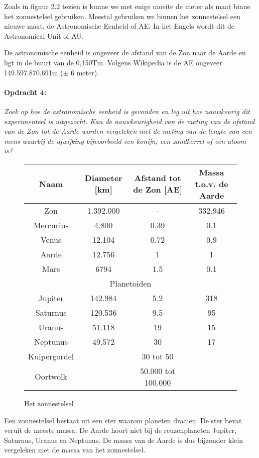Zoals in figuur 2.2 tezien is kunne we met enige moeite de meter als
maat binne het zonnestelsel gebruiken. Meestal gebruiken we binnen
het zonnestelsel een nieuwe maat, de Astronomische Eenheid of AE.
In het Engels wordt dit de Astronomical Unit of AU.

De astronomische eenheid is ongeveer de afstand van de Zon naar de
Aarde en ligt in de buurt van de 0,150Tm. Volgens Wikipedia is de
AE ongeveer 149.597.870.691m ($\pm$ 6 meter).


\paragraph*{Opdracht 4:}

\emph{Zoek op hoe de astronomische eenheid is gevonden en leg uit
hoe nauwkeurig dit experimenteel is uitgezocht. Kan de nauwkeurigheid
van de meting van de afstand van de Zon tot de Aarde worden vergeleken
met de meting van de lengte van een mens waarbij de afwijking bijvoorbeeld
een konijn, een zandkorrel of een atoom is?}

\begin{figure}[h]
\noindent \begin{centering}
\begin{tabular}{|c|c|c|c|}
\hline 
Naam & Diameter {[}km{]} & Afstand tot de Zon {[}AE{]} & Massa t.o.v. de Aarde\tabularnewline
\hline 
\hline 
Zon & 1.392.000 & - & 332.946\tabularnewline
\hline 
Mercurius & 4.800 & 0.39 & 0.1\tabularnewline
\hline 
Venus & 12.104 & 0.72 & 0.9\tabularnewline
\hline 
Aarde & 12.756 & 1 & 1\tabularnewline
\hline 
Mars & 6794 & 1.5 & 0.1\tabularnewline
\hline 
\multicolumn{4}{|c|}{Planetoiden}\tabularnewline
\hline 
Jupiter & 142.984 & 5.2 & 318\tabularnewline
\hline 
Saturnus & 120.536 & 9.5 & 95\tabularnewline
\hline 
Uranus & 51.118 & 19 & 15\tabularnewline
\hline 
Neptunus & 49.572 & 30 & 17\tabularnewline
\hline 
Kuipergordel &  & 30 tot 50 & \tabularnewline
\hline 
Oortwolk &  & 50.000 tot 100.000 & \tabularnewline
\hline 
\end{tabular}
\par\end{centering}

\caption{Het zonnestelsel}
\end{figure}


Een zonnestelsel bestaat uit een ster waarom planeten draaien. De
ster bevat veruit de meeste massa. De Aarde hoort niet bij de reuzenplaneten
Jupiter, Saturnus, Uranus en Neptunus. De massa van de Aarde is dus
bijzonder klein vergeleken met de massa van het zonnestelsel.


